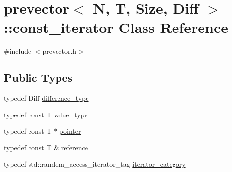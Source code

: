 \hypertarget{classprevector_1_1const__iterator}{}\section{prevector$<$ N, T, Size, Diff $>$\+:\+:const\+\_\+iterator Class Reference}
\label{classprevector_1_1const__iterator}


{\ttfamily \#include $<$prevector.\+h$>$}

\subsection*{Public Types}
\begin{DoxyCompactItemize}
\item 
typedef Diff \mbox{\hyperlink{classprevector_1_1const__iterator_a8c3d9b22578d2b87f14513d523b151e9}{difference\+\_\+type}}
\item 
typedef const T \mbox{\hyperlink{classprevector_1_1const__iterator_a5eb2ebba5993718446f0439d79b7157d}{value\+\_\+type}}
\item 
typedef const T $\ast$ \mbox{\hyperlink{classprevector_1_1const__iterator_a66b8b55134c8336e8beccf4669c6a32c}{pointer}}
\item 
typedef const T \& \mbox{\hyperlink{classprevector_1_1const__iterator_a0e0ec121eb938f268419ab5945fcda33}{reference}}
\item 
typedef std\+::random\+\_\+access\+\_\+iterator\+\_\+tag \mbox{\hyperlink{classprevector_1_1const__iterator_a378da53ceeb29f7e1c9370fe99f0df50}{iterator\+\_\+category}}
\end{DoxyCompactItemize}
